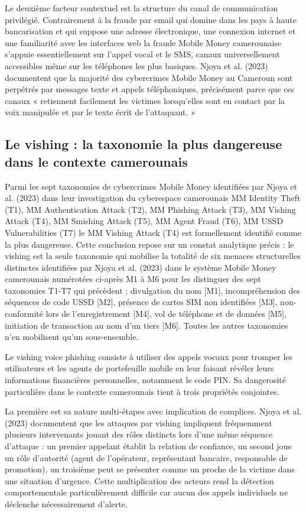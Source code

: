 \documentclass[11pt,a4paper,oneside]{report}
\theoremstyle{definition}
\theoremstyle{remark}
\begin{document}
Le deuxième facteur contextuel est la structure du canal de communication privilégié. Contrairement à la fraude par email qui domine dans les pays à haute bancarisation  et qui suppose une adresse électronique, une connexion internet et une familiarité avec les interfaces web  la fraude Mobile Money camerounaise s'appuie essentiellement sur l'appel vocal et le SMS, canaux universellement accessibles même sur les téléphones les plus basiques. Njoya et al. (2023) documentent que la majorité des cybercrimes Mobile Money au Cameroun sont perpétrés par messages texte et appels téléphoniques, précisément parce que ces canaux « retiennent facilement les victimes lorsqu'elles sont en contact par la voix manipulée et par le texte écrit de l'attaquant. »

\subsection{Le vishing : la taxonomie la plus dangereuse dans le contexte camerounais}

Parmi les sept taxonomies de cybercrimes Mobile Money identifiées par Njoya et al. (2023) dans leur investigation du cyberespace camerounais  MM Identity Theft (T1), MM Authentication Attack (T2), MM Phishing Attack (T3), MM Vishing Attack (T4), MM Smishing Attack (T5), MM Agent Fraud (T6), MM USSD Vulnerabilities (T7)  le MM Vishing Attack (T4) est formellement identifié comme la plus dangereuse. Cette conclusion repose sur un constat analytique précis : le vishing est la seule taxonomie qui mobilise la totalité de six menaces structurelles distinctes identifiées par Njoya et al. (2023) dans le système Mobile Money camerounais  numérotées ci-après M1 à M6 pour les distinguer des sept taxonomies T1-T7 qui précèdent : divulgation du nom [M1], incompréhension des séquences de code USSD [M2], présence de cartes SIM non identifiées [M3], non-conformité lors de l'enregistrement [M4], vol de téléphone et de données [M5], initiation de transaction au nom d'un tiers [M6]. Toutes les autres taxonomies n'en mobilisent qu'un sous-ensemble.

Le vishing  voice phishing  consiste à utiliser des appels vocaux pour tromper les utilisateurs et les agents de portefeuille mobile en leur faisant révéler leurs informations financières personnelles, notamment le code PIN. Sa dangerosité particulière dans le contexte camerounais tient à trois propriétés conjointes.

La première est sa nature multi-étapes avec implication de complices. Njoya et al. (2023) documentent que les attaques par vishing impliquent fréquemment plusieurs intervenants jouant des rôles distincts lors d'une même séquence d'attaque : un premier appelant établit la relation de confiance, un second joue un rôle d'autorité (agent de l'opérateur, représentant bancaire, responsable de promotion), un troisième peut se présenter comme un proche de la victime dans une situation d'urgence. Cette multiplication des acteurs rend la détection comportementale particulièrement difficile car aucun des appels individuels ne déclenche nécessairement d'alerte.
\end{document}
